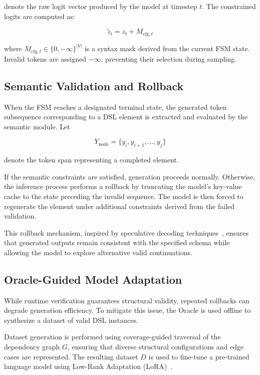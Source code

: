 denote the raw logit vector produced by the model at timestep $t$. The 
constrained logits are computed as:

\begin{equation}
\tilde{z}_t = z_t + M_{\text{cfg},t}
\end{equation}

where $M_{\text{cfg},t} \in \{0, -\infty\}^{|V|}$ is a syntax mask 
derived from the current FSM state. Invalid tokens are assigned $-\infty$, 
preventing their selection during sampling.

\subsection{Semantic Validation and Rollback}
When the FSM reaches a designated terminal state, the generated token 
subsequence corresponding to a DSL element is extracted and evaluated 
by the semantic module. Let

\begin{equation}
Y_{\text{node}} = \{y_i, y_{i+1}, \dots, y_j\}
\end{equation}

denote the token span representing a completed element.

If the semantic constraints are satisfied, generation proceeds normally. 
Otherwise, the inference process performs a rollback by truncating the model's 
key-value cache to the state preceding the invalid sequence. The model is then 
forced to regenerate the element under additional constraints derived from the 
failed validation.

This rollback mechanism, inspired by speculative decoding techniques~\cite{leviathan2023fast}, 
ensures that generated outputs remain consistent with the specified schema while allowing 
the model to explore alternative valid continuations.

\subsection{Oracle-Guided Model Adaptation}
While runtime verification guarantees structural validity, repeated rollbacks 
can degrade generation efficiency. To mitigate this issue, the Oracle is used 
offline to synthesize a dataset of valid DSL instances.

Dataset generation is performed using coverage-guided traversal of the 
dependency graph $G$, ensuring that diverse structural configurations and 
edge cases are represented. The resulting dataset $D$ is used to fine-tune 
a pre-trained language model using Low-Rank Adaptation (LoRA)~\cite{hu2021lora}.

